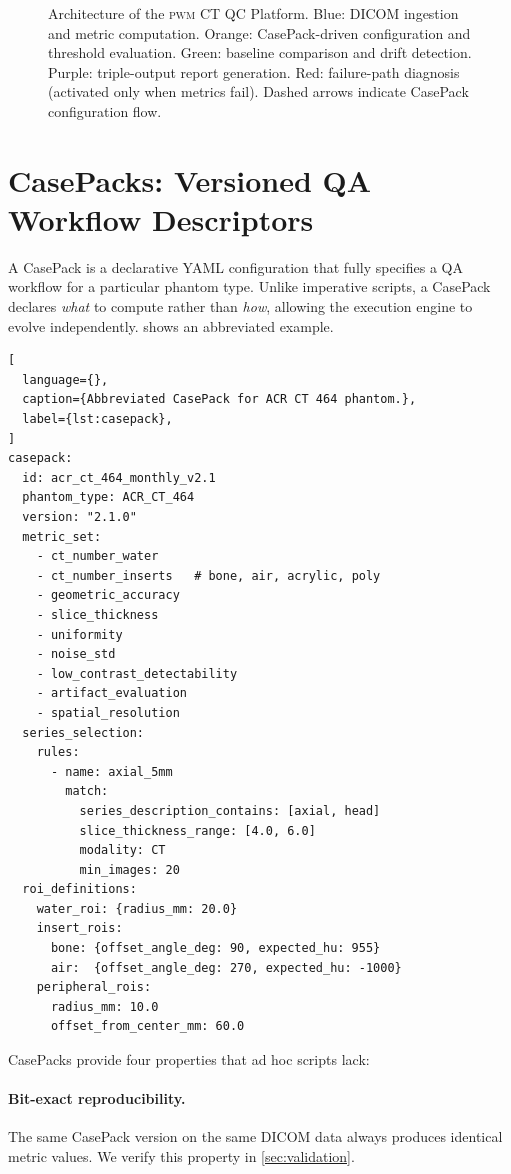 \documentclass[11pt]{article}
\newcommand{\pwm}{\textsc{pwm}}
\begin{document}
\begin{figure}[t]
\begin{tikzpicture}
\end{tikzpicture}
\caption{%
  Architecture of the \pwm{} CT QC Platform.
  Blue: DICOM ingestion and metric computation.
  Orange: CasePack-driven configuration and threshold evaluation.
  Green: baseline comparison and drift detection.
  Purple: triple-output report generation.
  Red: failure-path diagnosis (activated only when metrics fail).
  Dashed arrows indicate CasePack configuration flow.
}
\label{fig:architecture}
\end{figure}


\section{CasePacks: Versioned QA Workflow Descriptors}
\label{sec:casepacks}

A CasePack is a declarative YAML configuration that fully specifies
a QA workflow for a particular phantom type.
Unlike imperative scripts, a CasePack declares \emph{what} to
compute rather than \emph{how}, allowing the execution engine to
evolve independently.
 shows an abbreviated example.

\begin{lstlisting}[
  language={},
  caption={Abbreviated CasePack for ACR CT 464 phantom.},
  label={lst:casepack},
]
casepack:
  id: acr_ct_464_monthly_v2.1
  phantom_type: ACR_CT_464
  version: "2.1.0"
  metric_set:
    - ct_number_water
    - ct_number_inserts   # bone, air, acrylic, poly
    - geometric_accuracy
    - slice_thickness
    - uniformity
    - noise_std
    - low_contrast_detectability
    - artifact_evaluation
    - spatial_resolution
  series_selection:
    rules:
      - name: axial_5mm
        match:
          series_description_contains: [axial, head]
          slice_thickness_range: [4.0, 6.0]
          modality: CT
          min_images: 20
  roi_definitions:
    water_roi: {radius_mm: 20.0}
    insert_rois:
      bone: {offset_angle_deg: 90, expected_hu: 955}
      air:  {offset_angle_deg: 270, expected_hu: -1000}
    peripheral_rois:
      radius_mm: 10.0
      offset_from_center_mm: 60.0
\end{lstlisting}

CasePacks provide four properties that ad hoc scripts lack:

\paragraph{Bit-exact reproducibility.}
The same CasePack version on the same DICOM data always produces
identical metric values.
We verify this property in \cref{sec:validation}.
\end{document}
